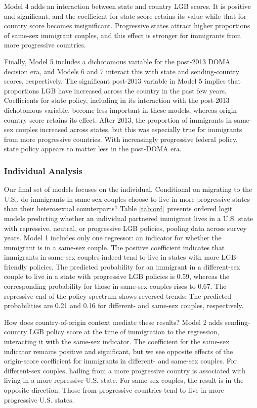 \documentclass[
  11pt,
]{article}
\begin{document}
Model 4 adds an interaction between state and country LGB scores. It is positive and significant, and the coefficient for state score retains its value while that for country score becomes insignificant. Progressive states attract higher proportions of same-sex immigrant couples, and this effect is stronger for immigrants from more progressive countries.

Finally, Model 5 includes a dichotomous variable for the post-2013 DOMA decision era, and Models 6 and 7 interact this with state and sending-country scores, respectively. The significant post-2013 variable in Model 5 implies that proportions LGB have increased across the country in the past few years. Coefficients for state policy, including in its interaction with the post-2013 dichotomous variable, become less important in these models, whereas origin-country score retains its effect. After 2013, the proportion of immigrants in same-sex couples increased across states, but this was especially true for immigrants from more progressive countries. With increasingly progressive federal policy, state policy appears to matter less in the post-DOMA era.

\hypertarget{individual-analysis}{%
\subsubsection{Individual Analysis}\label{individual-analysis}}

Our final set of models focuses on the individual. Conditional on migrating to the U.S., do immigrants in same-sex couples choose to live in more progressive states than their heterosexual counterparts? Table \ref{tab:ord} presents ordered logit models predicting whether an individual partnered immigrant lives in a U.S. state with repressive, neutral, or progressive LGB policies, pooling data across survey years. Model 1 includes only one regressor: an indicator for whether the immigrant is in a same-sex couple. The positive coefficient indicates that immigrants in same-sex couples indeed tend to live in states with more LGB-friendly policies. The predicted probability for an immigrant in a different-sex couple to live in a state with progressive LGB policies is 0.59, whereas the corresponding probability for those in same-sex couples rises to 0.67. The repressive end of the policy spectrum shows reversed trends: The predicted probabilities are 0.21 and 0.16 for different- and same-sex couples, respectively.

How does country-of-origin context mediate these results? Model 2 adds sending-country LGB policy score at the time of immigration to the regression, interacting it with the same-sex indicator. The coefficient for the same-sex indicator remains positive and significant, but we see opposite effects of the origin-score coefficient for immigrants in different- and same-sex couples. For different-sex couples, hailing from a more progressive country is associated with living in a more repressive U.S. state. For same-sex couples, the result is in the opposite direction: Those from progressive countries tend to live in more progressive U.S. states.
\end{document}
